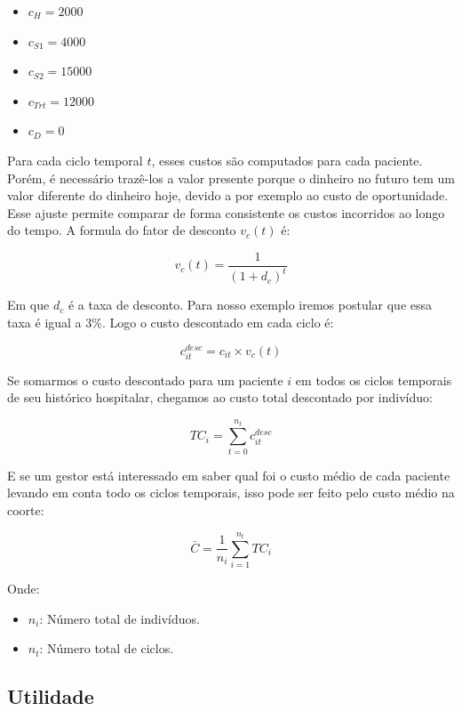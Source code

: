 \documentclass[12pt, a4paper, openany]{book}
\numberwithin{equation}{chapter}
\numberwithin{table}{chapter}
\numberwithin{figure}{chapter}
\theoremstyle{break}
\begin{document}
\begin{itemize}
    \item $c_H = 2000$

    \item $c_{S1} = 4000$ 

    \item $c_{S2} = 15000$ 

    \item $c_{Trt} = 12000$

    \item $c_{D} =  0$
\end{itemize}



Para cada ciclo temporal $t$, esses custos são computados para cada paciente. Porém, é necessário trazê-los a valor presente porque o dinheiro no futuro tem um valor diferente do dinheiro hoje, devido a por exemplo ao custo de oportunidade. Esse ajuste permite comparar de forma consistente os custos incorridos ao longo do tempo. A formula do fator de desconto $v_{c}(t)$ é:


    \[
    v_{c}(t) = \frac{1}{(1 + d_c)^t}
    \]


Em que  $d_c$ é a taxa de desconto. Para nosso exemplo iremos postular que essa taxa é igual a $3\%$. Logo o custo descontado em cada ciclo é:


    \[
    c_{it}^{desc} = c_{it} \times v_{c}(t)
    \]



Se somarmos o custo descontado para um paciente $i$ em todos os ciclos temporais de seu histórico hospitalar, chegamos ao custo total descontado por indivíduo:
    

    \[
    TC_i = \sum_{t=0}^{n_t} c_{it}^{desc}
    \]


E se um gestor está interessado em saber qual foi o custo médio de cada paciente levando em conta todo os ciclos temporais, isso pode ser feito pelo custo médio na coorte:

\[
\bar{C} = \frac{1}{n_i} \sum_{i=1}^{n_t} TC_i
 \]


Onde:
\begin{itemize}
    \item \( n_i \): Número total de indivíduos.
    \item \( n_t \): Número total de ciclos.
\end{itemize}

\subsection{Utilidade}
\end{document}
